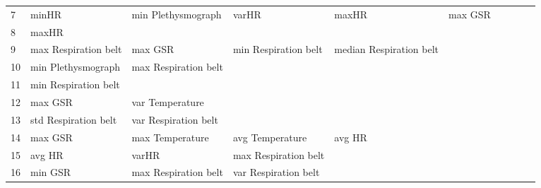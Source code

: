 \begin{landscape}
\begin{table}[]
\begin{tabular}{l|llllllll}
7        & minHR                   & min Plethysmograph    & varHR                   & maxHR                   & max GSR                 &                       &                      &          &                      &        \\
8        & maxHR                   &                       &                         &                         &                         &                       &                      &          &                      &        \\
9        & max Respiration belt    & max GSR               & min Respiration belt    & median Respiration belt &                         &                       &                      &          &                      &        \\
10       & min Plethysmograph      & max Respiration belt  &                         &                         &                         &                       &                      &          &                      &        \\
11       & min Respiration belt    &                       &                         &                         &                         &                       &                      &          &                      &        \\
12       & max GSR                 & var Temperature       &                         &                         &                         &                       &                      &          &                      &        \\
13       & std Respiration belt    & var Respiration belt  &                         &                         &                         &                       &                      &          &                      &        \\
14       & max GSR                 & max Temperature       & avg Temperature         & avg HR                  &                         &                       &                      &          &                      &        \\
15       & avg HR                  & varHR                 & max Respiration belt    &                         &                         &                       &                      &          &                      &        \\
16       & min GSR                 & max Respiration belt  & var Respiration belt    &                         &                         &                       &                      &          &                      &        \\

\end{tabular}
\end{table}
\end{landscape}
